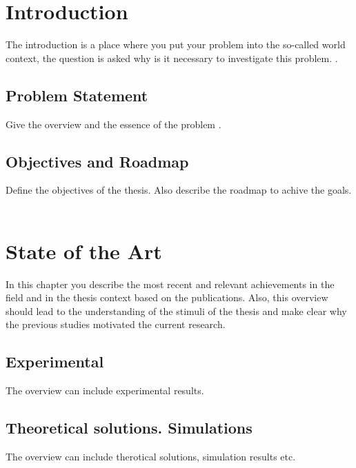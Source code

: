 \documentclass[12pt]{report}
\begin{document}
\chapter{Introduction}

The introduction is a place where you put your problem into the so-called world context, the question is asked why is it necessary to investigate this problem. \cite{bib:tyypviide,bib:tyypeng1,bib:rand}.
\\[5mm]
\lipsum[5]

\section{Problem Statement}
Give the overview and the essence of the problem \cite{bib:wiki-abstract,bib:rand}.
\\[5mm]
\lipsum[7]

\section{Objectives and Roadmap}
Define the objectives of the thesis. Also describe the roadmap to achive the goals.
\\[5mm]
\lipsum[8]
\\[5mm]
\lipsum[9]

\chapter{State of the Art}
In this chapter you describe the most recent and relevant achievements in the field and in the thesis context based on the publications. Also, this overview should lead to the understanding of the stimuli of the thesis and make clear why the previous studies motivated the current research.
\section{Experimental}
The overview can include experimental results.
\\[5mm]
\lipsum[10]
\section{Theoretical solutions. Simulations}
The overview can include therotical solutions, simulation results etc.
\\[5mm]
\lipsum[11]
\end{document}
